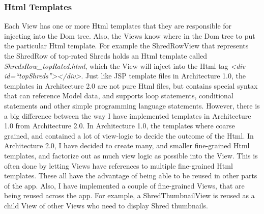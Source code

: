\subsubsection{Html Templates}
Each View has one or more Html templates that they are responsible for injecting into the Dom tree. Also, the Views know where in the Dom tree to put the particular Html template. For example the ShredRowView that represents the ShredRow of top-rated Shreds holds an Html template called \textit{ShredsRow\_topRated.html}, which the View will inject into the Html tag \textit{<div id=``topShreds''></div>}. Just like JSP template files in Architecture 1.0, the templates in Architecture 2.0 are not pure Html files, but contains special syntax that can reference Model data, and supports loop statements, conditional statements and other simple programming language statements. However, there is a big difference between the way I have implemented templates in Architecture 1.0 from Architecture 2.0. In Architecture 1.0, the templates where coarse grained, and contained a lot of view-logic to decide the outcome of the Html. In Architecture 2.0, I have decided to create many, and smaller fine-grained Html templates, and factorize out as much view logic as possible into the View. This is often done by letting Views have references to multiple fine-grained Html templates. These all have the advantage of being able to be reused in other parts of the app. Also, I have implemented a couple of fine-grained Views, that are being  reused across the app. For example, a ShredThumbnailView is reused as a child View of other Views who need to display Shred thumbnails. 

